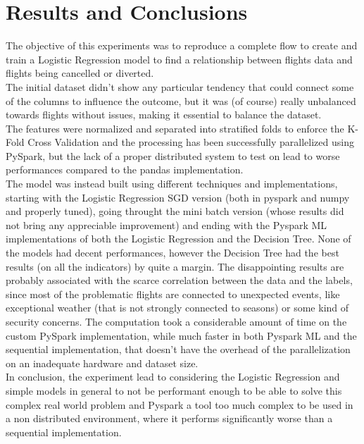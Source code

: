 \documentclass[
	letterpaper, %
	10pt, %
]{class}
\begin{document}

\section{Results and Conclusions}

The objective of this experiments was to reproduce a complete flow to create and train a Logistic Regression model to find a relationship between flights data and flights being cancelled or diverted.\\
The initial dataset didn't show any particular tendency that could connect some of the columns to influence the outcome, but it was (of course) really unbalanced towards flights without issues, making it essential to balance the dataset.\\
The features were normalized and separated into stratified folds to enforce the K-Fold Cross Validation and the processing has been successfully parallelized using PySpark, but the lack of a proper distributed system to test on lead to worse performances compared to the pandas implementation.\\

The model was instead built using different techniques and implementations, starting with the Logistic Regression SGD version (both in pyspark and numpy and properly tuned), going throught the mini batch version (whose results did not bring any appreciable improvement) and ending with the Pyspark ML implementations of both the Logistic Regression and the Decision Tree.
None of the models had decent performances, however the Decision Tree had the best results (on all the indicators) by quite a margin. The disappointing results are probably associated with the scarce correlation between the data and the labels, since most of the problematic flights are connected to unexpected events, like exceptional weather (that is not strongly connected to seasons) or some kind of security concerns.
The computation took a considerable amount of time on the custom PySpark implementation, while much faster in both Pyspark ML and the sequential implementation, that doesn't have the overhead of the parallelization on an inadequate hardware and dataset size.\\

In conclusion, the experiment lead to considering the Logistic Regression and simple models in general to not be performant enough to be able to solve this complex real world problem and Pyspark a tool too much complex to be used in a non distributed environment, where it performs significantly worse than a sequential implementation.


\printbibliography %

\end{document}
